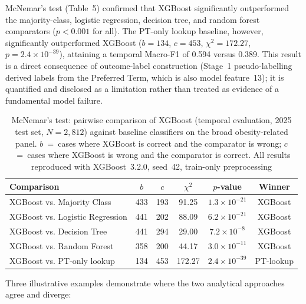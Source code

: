 \documentclass[10pt,a4paper]{article}
\begin{document}
McNemar's test (Table~5) confirmed that XGBoost significantly outperformed the majority-class, logistic regression, decision tree, and random forest comparators ($p<0.001$ for all). The PT-only lookup baseline, however, significantly outperformed XGBoost ($b=134$, $c=453$, $\chi^2=172.27$, $p=2.4 \times 10^{-39}$), attaining a temporal Macro-F1 of 0.594 versus 0.389. This result is a direct consequence of outcome-label construction (Stage~1 pseudo-labelling derived labels from the Preferred Term, which is also model feature~13); it is quantified and disclosed as a limitation rather than treated as evidence of a fundamental model failure.

\begin{table}[htbp]
\caption{McNemar's test: pairwise comparison of XGBoost (temporal evaluation, 2025 test set, $N=2{,}812$) against baseline classifiers on the broad obesity-related panel. $b$~=~cases where XGBoost is correct and the comparator is wrong; $c$~=~cases where XGBoost is wrong and the comparator is correct. All results reproduced with XGBoost~3.2.0, seed~42, train-only preprocessing}
\label{tab:mcnemar}
\centering\footnotesize
\begin{tabular}{|l|c|c|c|c|c|}
\hline
\textbf{Comparison} & \textbf{$b$} & \textbf{$c$} & \textbf{$\chi^2$} & \textbf{$p$-value} & \textbf{Winner} \\
\hline
XGBoost vs. Majority Class & 433 & 193 & 91.25 & $1.3 \times 10^{-21}$ & XGBoost \\
\hline
XGBoost vs. Logistic Regression & 441 & 202 & 88.09 & $6.2 \times 10^{-21}$ & XGBoost \\
\hline
XGBoost vs. Decision Tree & 441 & 294 & 29.00 & $7.2 \times 10^{-8}$ & XGBoost \\
\hline
XGBoost vs. Random Forest & 358 & 200 & 44.17 & $3.0 \times 10^{-11}$ & XGBoost \\
\hline
XGBoost vs. PT-only lookup & 134 & 453 & 172.27 & $2.4 \times 10^{-39}$ & PT-lookup \\
\hline
\end{tabular}
\end{table}

Three illustrative examples demonstrate where the two analytical approaches agree and diverge:
\end{document}

